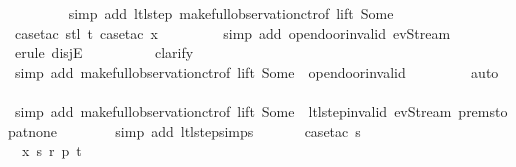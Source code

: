 \begin{isabellebody}
\ \ \ \ \ \ \ \isamarkupfalse%
\ {\isacharparenleft}simp\ add{\isacharcolon}\ ltl{\isacharunderscore}step{\isacharunderscore}{}\ make{\isacharunderscore}full{\isacharunderscore}observation{\isachardot}ctr{\isacharbrackleft}of\ lift\ {\isachardoublequoteopen}Some\ {}{\isachardoublequoteclose}{\isacharbrackright}{\isacharparenright}\isanewline
\ \ \ \ \ \ \ \isamarkupfalse%
\ {\isacharparenleft}case{\isacharunderscore}tac\ {\isachardoublequoteopen}stl\ t{\isachardoublequoteclose}{\isacharcomma}\ case{\isacharunderscore}tac\ x{}{\isacharparenright}\isanewline
\ \ \ \ \ \ \ \isamarkupfalse%
\ {\isacharparenleft}simp\ add{\isacharcolon}\ opendoor{\isacharunderscore}invalid\ ev{\isacharunderscore}Stream{\isacharparenright}\isanewline
\ \ \ \ \ \ \ \isamarkupfalse%
\ {\isacharparenleft}erule\ disjE{\isacharparenright}\isanewline
\ \ \ \ \ \ \ \ \isamarkupfalse%
\ clarify\isanewline
\ \ \ \ \ \ \ \ \isamarkupfalse%
\ {\isacharparenleft}simp\ add{\isacharcolon}\ make{\isacharunderscore}full{\isacharunderscore}observation{\isachardot}ctr{\isacharbrackleft}of\ lift\ {\isachardoublequoteopen}Some\ {}{\isachardoublequoteclose}{\isacharbrackright}\ opendoor{\isacharunderscore}invalid{\isacharparenright}\isanewline
\ \ \ \ \ \ \ \isamarkupfalse%
\ auto{\isacharbrackleft}{}{\isacharbrackright}\isanewline
\ \ \ \ \ \ \isamarkupfalse%
\ {\isacharparenleft}simp\ add{\isacharcolon}\ make{\isacharunderscore}full{\isacharunderscore}observation{\isachardot}ctr{\isacharbrackleft}of\ lift\ {\isachardoublequoteopen}Some\ {}{\isachardoublequoteclose}{\isacharbrackright}\ ltl{\isacharunderscore}step{\isacharunderscore}{}{\isacharunderscore}invalid\ ev{\isacharunderscore}Stream\ prem{\isacharunderscore}stop{\isacharunderscore}at{\isacharunderscore}none{\isacharparenright}\isanewline
\ \ \ \ \ \ \isamarkupfalse%
\ {\isacharparenleft}simp\ add{\isacharcolon}\ ltl{\isacharunderscore}step{\isachardot}simps{\isacharparenright}\isanewline
\isanewline
\ \ \ \ \ \isamarkupfalse%
\ {\isacharparenleft}case{\isacharunderscore}tac\ {\isachardoublequoteopen}s\ {\isasymin}\ {\isacharbraceleft}{}{\isacharcomma}\ {}{\isacharcomma}\ {}{\isacharcomma}\ {}{\isacharbraceright}{\isachardoublequoteclose}{\isacharparenright}\isanewline
\ \ \ \ \ \isamarkupfalse%
\ \ x\ s\ r\ p\ t\isanewline

\end{isabellebody}
